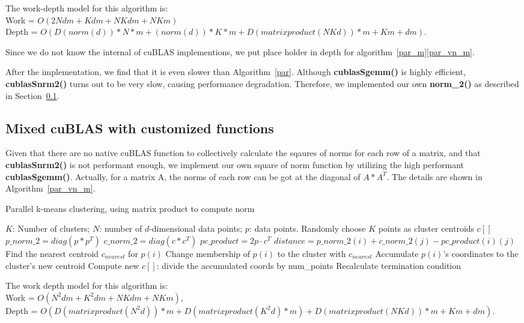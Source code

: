 \vspace{5mm}
\noindent
The work-depth model for this algorithm is: \\
Work = $O(2Ndm + Kdm + NKdm + NKm)$ \\
Depth = $O(D(norm(d))*N*m + (norm(d))*K*m + D(matrix product(NKd))*m + Km + dm)$.

\vspace{3mm}

Since we do not know the internal of cuBLAS implementions, we put place holder
in depth for algorithm~\ref{par_m}\ref{par_vn_m}. 

After the implementation, we find that it is even slower than Algorithm~\ref{par}.
Although \textbf{cublasSgemm()} is highly efficient, \textbf{cublasSnrm2()} 
turns out to be very slow, causing performance degradation.
Therefore, we implemented our own \textbf{norm\_2()} as described in 
Section~\ref{ss:mix}.


\subsection{Mixed cuBLAS with customized functions}
\label{ss:mix}

Given that there are no native cuBLAS function to collectively calculate the
sqaures of norms for each row of a matrix, and that \textbf{cublasSnrm2()} is
not performant enough, we implement our own square of norm function by utilizing
the high performant \textbf{cublasSgemm()}.
Actually, for a matrix A, the norms of each row can be got at the diagonal of 
$A * A^T$. The details are shown in Algorithm~\ref{par_vn_m}. 

\begin{algorithm}[!h]
  \caption{Parallel k-means clustering, using matrix product to compute norm} \label{par_vn_m}
  \begin{algorithmic}[1]
    \INPUT $K$: Number of clusters; $N$: number of $d$-dimensional data points; $p$: data points.
     \label{alg:pm2}
    \State Randomly choose $K$ points as cluster centroids $c[]$
    \State $p\_norm\_2 = diag(p * p^T)$
    \State $c\_norm\_2 = diag(c * c^T)$
    \State $pc\_product = 2 p \cdot c^T$
    \State $distance = p\_norm\_2(i) + c\_norm\_2(j) - pc\_product(i)(j)$
    \EndFor
    \State Find the nearest centroid $c_{nearest}$ for $p(i)$
    \State Change membership of $p(i)$ to the cluster with $c_{nearest}$
    \State Accumulate $p(i)$'s coordinates to the cluster's new centroid
    \EndParFor
    \State Compute new $c[]$: divide the accumulated coords by num\_points
    \State Recalculate termination condition
    \EndWhile
    \EndFunction
  \end{algorithmic}
\end{algorithm}

\vspace{5mm}
\noindent
The work depth model for this algorithm is: \\
Work = $O(N^2dm + K^2dm + NKdm + NKm)$, \\
Depth = $O(D(matrix product(N^2d))*m + D(matrix product(K^2d)*m) + D(matrix product(NKd))*m+ Km + dm)$.
